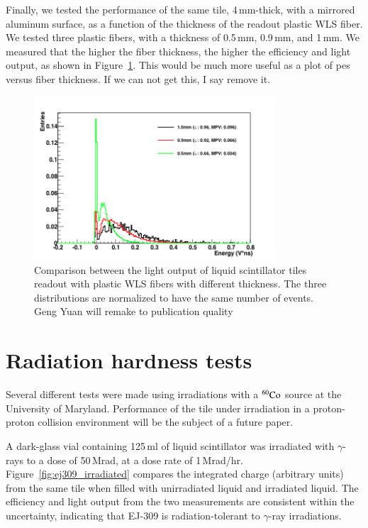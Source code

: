 \documentclass[review]{elsarticle}
\begin{document}
Finally, we tested the performance of the same tile, 4\,mm-thick, with a
mirrored aluminum surface, as a function of the thickness of the
readout plastic WLS fiber. We tested three plastic fibers, with a
thickness of 0.5\,mm, 0.9\,mm, and 1\,mm. We measured that the higher the
fiber thickness, the higher the efficiency and light output, as shown
in Figure~\ref{fig:fiber_thickness_comp}.
{\Large \color{red} This would be much more useful as a plot of pes versus fiber thickness.  If we can not get this, I say remove it.}

\begin{figure}[!ht]
\begin{center}
\includegraphics[width=0.8\textwidth]{./figures/list_Fiber_Thickness_all_1.png}
\caption{Comparison between the light output of liquid scintillator
  tiles readout with plastic WLS fibers with different thickness. The
  three distributions are normalized to have the same number of
  events.{\color{red} Geng Yuan will remake to publication quality}}
\label{fig:fiber_thickness_comp}
\end{center}
\end{figure}

\section{Radiation hardness tests}

Several different tests were made using irradiations with a
$\rm{^{60}Co}$ source at the University of Maryland.
Performance of the tile under irradiation in a proton-proton collision
environment will be the subject of a future paper.

A dark-glass vial containing 125\,ml
of liquid scintillator was irradiated with $\gamma$-rays to a
dose of 50\,Mrad, at a dose rate of 1\,Mrad/hr.
Figure~\ref{fig:ej309_irradiated} compares the integrated charge (arbitrary units)
from the same tile when filled with unirradiated liquid and irradiated liquid.
The efficiency and light output from the two measurements are
consistent within the uncertainty, indicating that EJ-309 is
radiation-tolerant to $\gamma$-ray irradiations.
\end{document}
